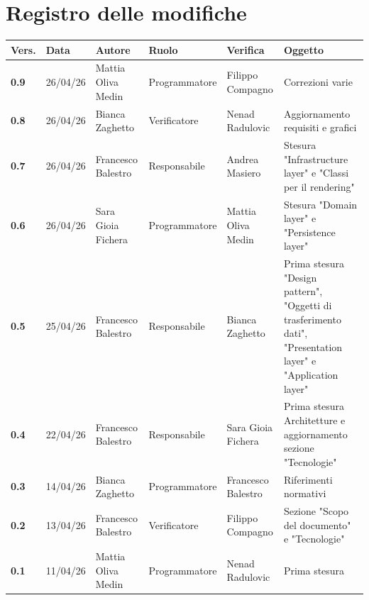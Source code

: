 \documentclass[a4paper,12pt]{article}
\begin{document}
    

    \section*{Registro delle modifiche} {
        \begin{table}[h!]
                \begin{tabularx}{\textwidth}{|l|l|l|l|L|L|}
                \hline
                \textbf{Vers.} & \textbf{Data} & \textbf{Autore} & \textbf{Ruolo} & \textbf{Verifica} & \textbf{Oggetto} \\
                \hline
                \textbf{0.9} & 26/04/26 & Mattia Oliva
                Medin & Programmatore & Filippo Compagno & Correzioni varie \\
                \hline
                \textbf{0.8} & 26/04/26 & Bianca Zaghetto & Verificatore & Nenad Radulovic & Aggiornamento requisiti e grafici \\
                \hline
                \textbf{0.7} & 26/04/26 & Francesco Balestro & Responsabile & Andrea Masiero & Stesura "Infrastructure layer" e "Classi per il rendering" \\
                \hline
                \textbf{0.6} & 26/04/26 & Sara Gioia Fichera & Programmatore & Mattia Oliva Medin & Stesura "Domain layer" e "Persistence layer" \\
                \hline
                \textbf{0.5} & 25/04/26 & Francesco Balestro & Responsabile & Bianca Zaghetto & Prima stesura "Design pattern", "Oggetti di trasferimento dati", "Presentation layer" e "Application layer" \\
                \hline
                \textbf{0.4} & 22/04/26 & Francesco Balestro & Responsabile & Sara Gioia Fichera & Prima stesura Architetture e aggiornamento sezione "Tecnologie" \\
                \hline
                \textbf{0.3} & 14/04/26 & Bianca Zaghetto & Programmatore & Francesco Balestro & Riferimenti normativi \\
                \hline
                \textbf{0.2} & 13/04/26 & Francesco Balestro & Verificatore & Filippo Compagno & Sezione "Scopo del documento" e "Tecnologie" \\
                \hline
                \textbf{0.1} & 11/04/26 & Mattia Oliva Medin & Programmatore & Nenad Radulovic & Prima stesura \\
                \hline
            \end{tabularx}
        \end{table}
    }
    \newpage
    
\end{document}
